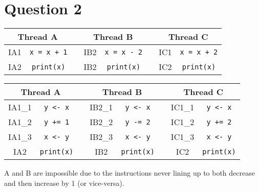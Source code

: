 \documentclass{article}
\begin{document}
\section*{Question 2}
\begin{tabular}{|cc|c|cc|c|cc|}
    \multicolumn{2}{c}{Thread A} &                    & \multicolumn{2}{c}{Thread B} &     & \multicolumn{2}{c}{Thread C}                               \\
    \hline
    IA1                          & \texttt{x = x + 1} &                              & IB2 & \texttt{x = x - 2}           &  & IC1 & \texttt{x = x + 2} \\
    IA2                          & \texttt{print(x)}  &                              & IB2 & \texttt{print(x)}            &  & IC2 & \texttt{print(x)}  \\
    \hline
\end{tabular}

\begin{tabular}{|cc|c|cc|c|cc|}
    \multicolumn{2}{c}{Thread A} &                   & \multicolumn{2}{c}{Thread B} &        & \multicolumn{2}{c}{Thread C}                                 \\
    \hline
    IA1\_1                       & \texttt{y <- x}   &                              & IB2\_1 & \texttt{y <- x}              &  & IC1\_1 & \texttt{y <- x}   \\
    IA1\_2                       & \texttt{y += 1}   &                              & IB2\_2 & \texttt{y -= 2}              &  & IC1\_2 & \texttt{y += 2}   \\
    IA1\_3                       & \texttt{x <- y}   &                              & IB2\_3 & \texttt{x <- y}              &  & IC1\_3 & \texttt{x <- y}   \\
    IA2                          & \texttt{print(x)} &                              & IB2    & \texttt{print(x)}            &  & IC2    & \texttt{print(x)} \\
    \hline
\end{tabular}

A and B are impossible due to the instructions never lining up to both decrease
and then increase by 1 (or vice-versa).

\end{document}
